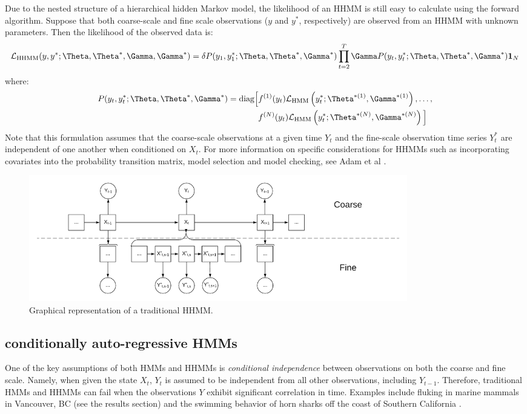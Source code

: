 Due to the nested structure of a hierarchical hidden Markov model, the likelihood of an HHMM is still easy to calculate using the forward algorithm. Suppose that both coarse-scale and fine scale observations ($y$ and $y^*$, respectively) are observed from an HHMM with unknown parameters. Then the likelihood of the observed data is:
%
$$\calL_{\text{HHMM}}(y,y^*;\Theta,\Theta^*,\Gamma,\Gamma^*) = \delta P(y_1,y_1^*;\Theta,\Theta^*,\Gamma^*) \prod_{t=2}^T \Gamma P(y_t,y_t^*;\Theta,\Theta^*,\Gamma^*) \mathbf{1}_N$$
%
where:
%
\begin{align*}
	P(y_t,y_t^*;\Theta,\Theta^*,\Gamma^*) = \text{diag}\Big[&f^{(1)}(y_t)\calL_{\text{HMM}}\left(y_t^*;\Theta^{*(1)},\Gamma^{*(1)}\right),\ldots, \\
	&f^{(N)}(y_t)\calL_{\text{HMM}}\left(y_t^*;\Theta^{*(N)},\Gamma^{*(N)}\right) \Big]
\end{align*}
%
Note that this formulation assumes that the coarse-scale observations at a given time $Y_t$ and the fine-scale observation time series $Y_t^*$ are independent of one another when conditioned on $X_t$. For more information on specific considerations for HHMMs such as incorporating covariates into the probability transition matrix, model selection and model checking, see Adam et al \cite{Adam:2019}.

\begin{figure}[h!]
	\centering
	\includegraphics[width=6.5in]{../Plots/HHMM.png}
	\caption{Graphical representation of a traditional HHMM.}
	\label{fig:HHMM}
\end{figure}


\subsection{conditionally auto-regressive HMMs}

One of the key assumptions of both HMMs and HHMMs is \textit{conditional independence} between observations on both the coarse and fine scale. Namely, when given the state $X_t$, $Y_t$ is assumed to be independent from all other observations, including $Y_{t-1}$. Therefore, traditional HMMs and HHMMs can fail when the observations $Y$ exhibit significant correlation in time. Examples include fluking in marine mammals in Vancouver, BC (see the results section) and the swimming behavior of horn sharks off the coast of Southern California \cite{Adam:2019}.

